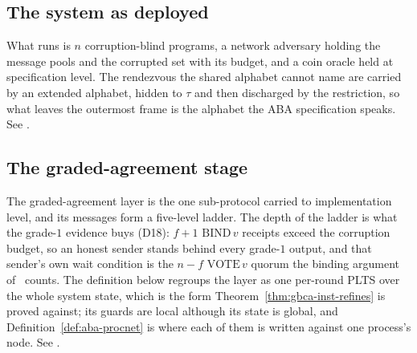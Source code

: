 \subsection{The system as deployed}

What runs is $n$ corruption-blind programs, a network adversary holding the message pools and the corrupted set with its budget, and a coin oracle held at specification level.
The rendezvous the shared alphabet cannot name are carried by an extended alphabet, hidden to $\tau$ and then discharged by the restriction, so what leaves the outermost frame is the alphabet the ABA specification speaks.
See .





\subsection{The graded-agreement stage}

The graded-agreement layer is the one sub-protocol carried to implementation level, and its messages form a five-level ladder.
The depth of the ladder is what the grade-$1$ evidence buys (D18): $f{+}1$ $\mathrm{BIND}\,v$ receipts exceed the corruption budget, so an honest sender stands behind every grade-$1$ output, and that sender's own wait condition is the $n{-}f$ $\mathrm{VOTE}\,v$ quorum the binding argument of~\cite{ABDY22} counts.
The definition below regroups the layer as one per-round PLTS over the whole system state, which is the form Theorem~\ref{thm:gbca-inst-refines} is proved against; its guards are local although its state is global, and Definition~\ref{def:aba-procnet} is where each of them is written against one process's node.
See .




